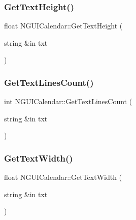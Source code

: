 \hypertarget{class_n_g_u_i_calendar_a44e0dd6874983d3c6053d8ad9c2d23ec}{}\label{class_n_g_u_i_calendar_a44e0dd6874983d3c6053d8ad9c2d23ec} 
\subsubsection{\texorpdfstring{Get\+Text\+Height()}{GetTextHeight()}}
{\footnotesize\ttfamily float N\+G\+U\+I\+Calendar\+::\+Get\+Text\+Height (\begin{DoxyParamCaption}\item[{string \&in}]{txt }\end{DoxyParamCaption})}

\hypertarget{class_n_g_u_i_calendar_a14e4f05da25580392c134b88cd02d9f2}{}\label{class_n_g_u_i_calendar_a14e4f05da25580392c134b88cd02d9f2} 
\subsubsection{\texorpdfstring{Get\+Text\+Lines\+Count()}{GetTextLinesCount()}}
{\footnotesize\ttfamily int N\+G\+U\+I\+Calendar\+::\+Get\+Text\+Lines\+Count (\begin{DoxyParamCaption}\item[{string \&in}]{txt }\end{DoxyParamCaption})}

\hypertarget{class_n_g_u_i_calendar_a2005e7bbd16a3053203d196dd7d78adf}{}\label{class_n_g_u_i_calendar_a2005e7bbd16a3053203d196dd7d78adf} 
\subsubsection{\texorpdfstring{Get\+Text\+Width()}{GetTextWidth()}}
{\footnotesize\ttfamily float N\+G\+U\+I\+Calendar\+::\+Get\+Text\+Width (\begin{DoxyParamCaption}\item[{string \&in}]{txt }\end{DoxyParamCaption})}

